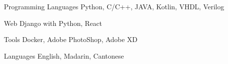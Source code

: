 


\begin{cvskills}


\cvskill
{Programming Languages} %
{Python, C/C++, JAVA, Kotlin, VHDL, Verilog} %


\cvskill
{Web} %
{Django with Python, React} %


\cvskill
{Tools} %
{Docker, Adobe PhotoShop, Adobe XD} %


\cvskill
{Languages} %
{English, Madarin, Cantonese} %


\end{cvskills}